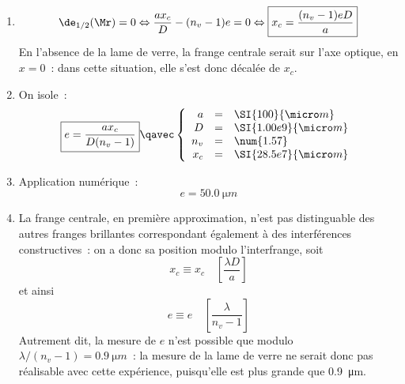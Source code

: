\documentclass[a4paper, 12pt, final, garamond]{book}
\begin{document}
\begin{enumerate}
    \item 
        \begin{gather*}
            \de_{1/2}(\Mr) = 0
            \Leftrightarrow
            \frac{ax_c}{D} - (n_v-1)e = 0
            \Leftrightarrow
            \boxed{x_c = \frac{(n_v-1)eD}{a}}
        \end{gather*}
        En l'absence de la lame de verre, la frange centrale serait sur l'axe
        optique, en $x = 0$~: dans cette situation, elle s'est donc décalée de
        $x_c$.
    \item On isole~:
        \[\boxed{e = \frac{ax_c}{D(n_v-1)}}
        \qavec
        \left\{
        \begin{array}{rcl}
            a & = & \SI{100}{\micro m}\\
            D & = & \SI{1.00e9}{\micro m}\\
            n_v & = & \num{1.57}\\
            x_c & = & \SI{28.5e7}{\micro m}
        \end{array}
        \right.\]
    \item Application numérique~:
        \[\boxed{e = \SI{50.0}{\micro m}}\]
    \item La frange centrale, en première approximation, n'est pas distinguable
        des autres franges brillantes correspondant également à des
        interférences constructives~: on a donc sa position modulo
        l'interfrange, soit
        \[x_c \equiv x_c \quad \left[ \frac{\lambda D}{a} \right]\]
        et ainsi
        \[e \equiv e \quad \left[ \frac{\lambda}{n_v-1} \right]\]
        Autrement dit, la mesure de $e$ n'est possible que modulo
        $\lambda/(n_v-1) = \SI{0.9}{\micro m}$~: la mesure de la lame de verre
        ne serait donc pas réalisable avec cette expérience, puisqu'elle est
        plus grande que \SI{0.9}{\micro m}.
\end{enumerate}
\end{document}
